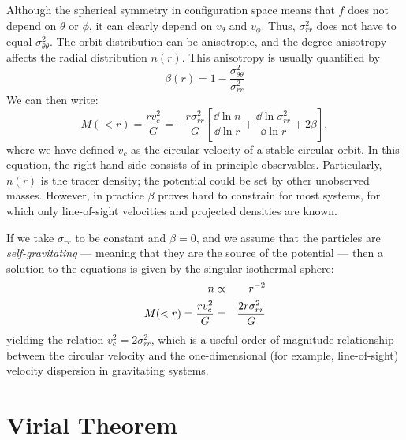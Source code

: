 Although the spherical symmetry in configuration space means that $f$
does not depend on $\theta$ or $\phi$, it can clearly depend on
$v_\theta$ and $v_\phi$. Thus, $\sigma_{rr}^2$ does not have to equal
$\sigma_{\theta\theta}^2$. The orbit distribution can be anisotropic,
and the degree anisotropy affects the radial distribution $n(r)$.
This anisotropy is usually quantified by
\begin{equation}
\beta(r)  = 1 - \frac{\sigma_{\theta\theta}^2}{\sigma_{rr}^2}
\end{equation}
We can then write:
\begin{equation}
 \label{eq:sphericalmass}
M(<r) = \frac{rv_c^2}{G} = - \frac{r \sigma_{rr}^2}{G}
\left[\frac{\dd{\ln n}}{\dd{\ln r}}
+ \frac{\dd{\ln \sigma_{rr}^2}}{\dd{\ln r}} + 2 \beta\right],
\end{equation}
where we have defined $v_c$ as the circular velocity of a stable
circular orbit. In this equation, the right hand side consists of
in-principle observables. Particularly, $n(r)$ is the tracer density;
the potential could be set by other unobserved masses. However, in
practice $\beta$ proves hard to constrain for most systems, for which
only line-of-sight velocities and projected densities are known.

If we take $\sigma_{rr}$ to be constant and $\beta=0$, and we assume
that the particles are {\it self-gravitating} --- meaning that they
are the source of the potential --- then a solution to the equations
is given by the singular isothermal sphere:
\begin{eqnarray}
\label{eq:isothermal}
n &\propto& r^{-2} \cr
M(<r) = \frac{rv_c^2}{G} &=& \frac{2 r \sigma_{rr}^2}{G}
\end{eqnarray}
yielding the relation $v_c^2 = 2\sigma_{rr}^2$, which is a useful
order-of-magnitude relationship between the circular velocity and the
one-dimensional (for example, line-of-sight) velocity dispersion in
gravitating systems.

\section{Virial Theorem}

